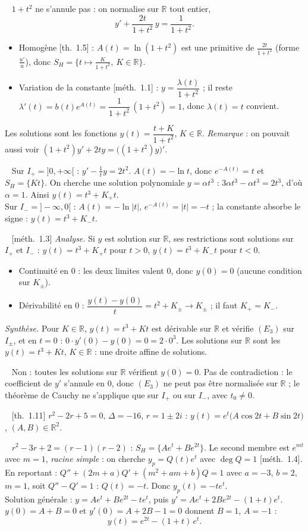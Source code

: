 \documentclass[a4paper,11pt]{article}
\newcommand{\R}{\mathbb{R}}\newcommand{\C}{\mathbb{C}}\newcommand{\K}{\mathbb{K}}
\newcommand{\q}[1]{\par\needspace{3\baselineskip}\smallskip{\sffamily\bfseries\color{Bleu}#1}\ }
\newcommand{\prop}[1]{{\sffamily\footnotesize\color{Gris}[#1]}}
\begin{document}
\q{2.} $1+t^2$ ne s'annule pas : on normalise sur $\R$ tout entier,
\[y'+\frac{2t}{1+t^2}\,y=\frac1{1+t^2}.\]
\begin{itemize}
\item Homogène \prop{th.~1.5} : $A(t)=\ln(1+t^2)$ est une primitive de $\frac{2t}{1+t^2}$ (forme $\frac{u'}u$), donc
      $S_H=\big\{t\mapsto\frac K{1+t^2},\ K\in\R\big\}$.
\item Variation de la constante \prop{méth.~1.1} : $y=\dfrac{\lambda(t)}{1+t^2}$ ; il reste
      $\lambda'(t)=b(t)e^{A(t)}=\dfrac1{1+t^2}\,(1+t^2)=1$, donc $\lambda(t)=t$ convient.
\end{itemize}
Les solutions sont les fonctions $y(t)=\dfrac{t+K}{1+t^2}$, $K\in\R$.
\emph{Remarque} : on pouvait aussi voir $(1+t^2)y'+2ty=\big((1+t^2)y\big)'$.

\q{3.a)} Sur $I_+=]0,+\infty[$ : $y'-\frac1ty=2t^2$. $A(t)=-\ln t$, donc $e^{-A(t)}=t$ et $S_H=\{Kt\}$. On cherche une solution
polynomiale $y=\alpha t^3$ : $3\alpha t^3-\alpha t^3=2t^3$, d'où $\alpha=1$. Ainsi $y(t)=t^3+K_+t$.\\
Sur $I_-=]-\infty,0[$ : $A(t)=-\ln|t|$, $e^{-A(t)}=|t|=-t$ ; la constante absorbe le signe : $y(t)=t^3+K_-t$.

\q{3.b)} \prop{méth.~1.3} \emph{Analyse.} Si $y$ est solution sur $\R$, ses restrictions sont solutions sur $I_+$ et $I_-$ :
$y(t)=t^3+K_+t$ pour $t>0$, $y(t)=t^3+K_-t$ pour $t<0$.
\begin{itemize}
\item Continuité en $0$ : les deux limites valent $0$, donc $y(0)=0$ (aucune condition sur $K_\pm$).
\item Dérivabilité en $0$ : $\dfrac{y(t)-y(0)}{t}=t^2+K_\pm\to K_\pm$ ; il faut $K_+=K_-$.
\end{itemize}
\emph{Synthèse.} Pour $K\in\R$, $y(t)=t^3+Kt$ est dérivable sur $\R$ et vérifie $(E_3)$ sur $I_\pm$, et en $t=0$ :
$0\cdot y'(0)-y(0)=0=2\cdot0^3$. Les solutions sur $\R$ sont les $y(t)=t^3+Kt$, $K\in\R$ : une droite affine de solutions.

\q{3.c)} Non : toutes les solutions sur $\R$ vérifient $y(0)=0$. Pas de contradiction : le coefficient de $y'$ s'annule en
$0$, donc $(E_3)$ ne peut pas être normalisée sur $\R$ ; le théorème de Cauchy ne s'applique que sur $I_+$ ou sur $I_-$, avec
$t_0\neq0$.

\q{4.a)} \prop{th.~1.11} $r^2-2r+5=0$, $\Delta=-16$, $r=1\pm2i$ : $y(t)=e^{t}\big(A\cos2t+B\sin2t\big)$, $(A,B)\in\R^2$.

\q{4.b)} $r^2-3r+2=(r-1)(r-2)$ : $S_H=\{Ae^{t}+Be^{2t}\}$. Le second membre est $e^{mt}$ avec $m=1$, \emph{racine simple} : on
cherche $y_p=Q(t)e^{t}$ avec $\deg Q=1$ \prop{méth.~1.4}. En reportant :
$Q''+(2m+a)Q'+(m^2+am+b)Q=1$ avec $a=-3$, $b=2$, $m=1$, soit $Q''-Q'=1$ : $Q(t)=-t$. Donc $y_p(t)=-te^{t}$.\\
Solution générale : $y=Ae^{t}+Be^{2t}-te^{t}$, puis $y'=Ae^{t}+2Be^{2t}-(1+t)e^{t}$.\\
$y(0)=A+B=0$ et $y'(0)=A+2B-1=0$ donnent $B=1$, $A=-1$ :
\[y(t)=e^{2t}-(1+t)\,e^{t}.\]
\end{document}
